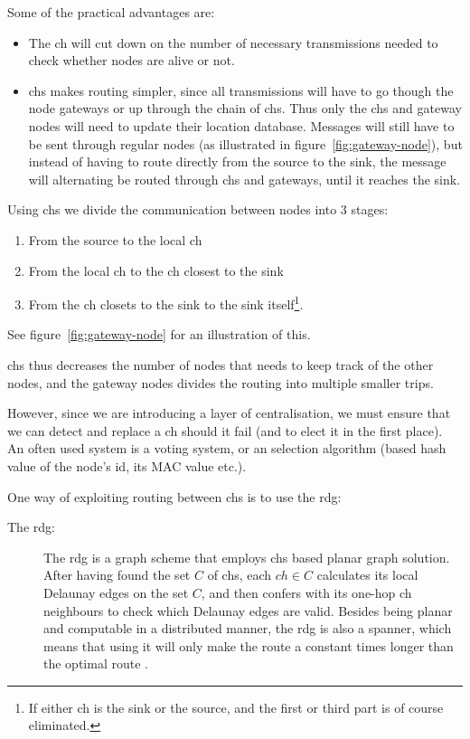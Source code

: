 Some of the practical advantages are:
\begin{itemize}
\item The \ac{ch} will cut down on the number of necessary transmissions needed to check whether nodes are alive or not.
\item \acp{ch} makes routing simpler, since all transmissions will have to go though the node gateways or up through the chain of \acp{ch}. Thus only the \acp{ch} and gateway nodes will need to update their location database. Messages will still have to be sent through regular nodes (as illustrated in figure~\ref{fig:gateway-node}), but instead of having to route directly from the source to the sink, the message will alternating be routed through \acp{ch} and gateways, until it reaches the sink.
\end{itemize}

Using \acp{ch} we divide the communication between nodes into 3 stages:
\begin{enumerate}
\item From the source to the local \ac{ch} 
\item From the local \ac{ch} to the \ac{ch} closest to the sink
\item From the \ac{ch} closets to the sink to the sink itself\footnote{If either \ac{ch} is the sink or the source, and the first or third part is of course eliminated.}.
\end{enumerate}
See figure~\ref{fig:gateway-node} for an illustration of this.

 \acp{ch} thus decreases the number of nodes that needs to keep track of the other nodes, and the gateway nodes divides the routing into multiple smaller trips.  

However, since we are introducing a layer of centralisation, we must ensure that we can detect and replace a \ac{ch} should it fail (and to elect it in the first place). An often used system is a voting system, or an selection algorithm (based hash value of the node's id, its MAC value etc.).

One way of exploiting routing between \acp{ch} is to use the \ac{rdg}:
\begin{description}
\item[The \ac{rdg}:] The \ac{rdg} is a graph scheme that employs \acp{ch} based planar graph solution. After having found the set $C$ of \acp{ch}, each $ch \in C$ calculates its local Delaunay edges on the set $C$, and then confers with its one-hop \ac{ch} neighbours to check which Delaunay edges are valid. Besides being planar and computable in a distributed manner, the \ac{rdg} is also a spanner, which means that using it will only make the route a constant times longer than the optimal route \cite{GeoSpanners}.
\end{description}

